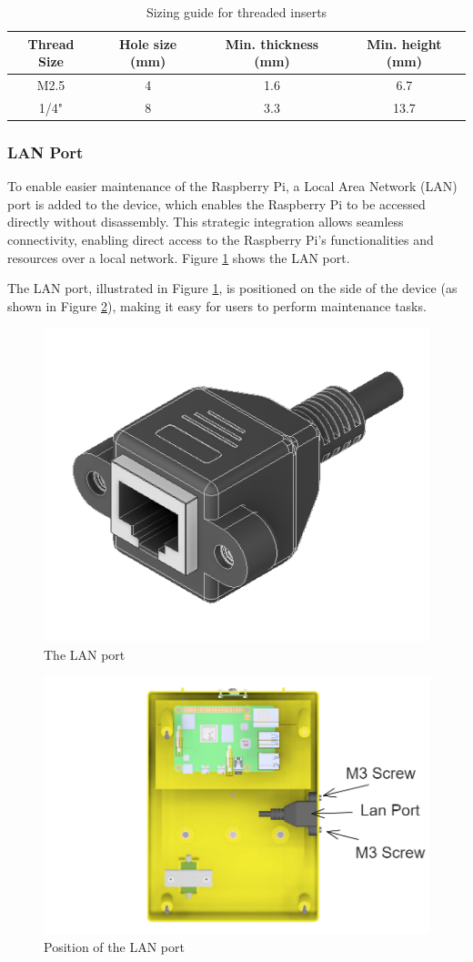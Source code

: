 \begin{table}[!ht]
    \centering
    \begin{tabular}{|c|c|c|c|}
        \hline
        \textbf{Thread Size} & \textbf{Hole size (mm)} & \textbf{Min. thickness (mm)} & \textbf{Min. height (mm)} \\ \hline
        M2.5                 & 4                       & 1.6                          & 6.7                       \\ \hline
        1/4"                 & 8                       & 3.3                          & 13.7                      \\ \hline
    \end{tabular}
    \caption{Sizing guide for threaded inserts \cite{ruthex1}\cite{ruthex2}}
    \label{tab:threaded_inserts_sizing_guide}
\end{table}


\subsubsection{LAN Port}
To enable easier maintenance of the Raspberry Pi, a Local Area Network (LAN) port is added to the device, which enables the Raspberry Pi to be accessed directly without disassembly. This strategic integration allows seamless connectivity, enabling direct access to the Raspberry Pi's functionalities and resources over a local network. Figure \ref{fig:lan_port} shows the LAN port.

The LAN port, illustrated in Figure \ref{fig:lan_port}, is positioned on the side of the device (as shown in Figure \ref{fig:lan_port_position}), making it easy for users to perform maintenance tasks.

\begin{figure}[!ht]
    \centering
    \includegraphics[height=5 cm]{texs/Part1/chapter4/image/d31.png}
    \caption{The LAN port}
    \label{fig:lan_port}
\end{figure}

\begin{figure}[!ht]
    \centering
    \includegraphics[height=5 cm]{texs/Part1/chapter4/image/d32.png}
    \caption{Position of the LAN port}
    \label{fig:lan_port_position}
\end{figure}

